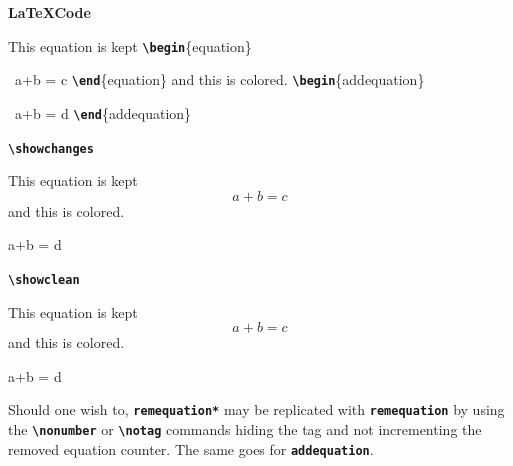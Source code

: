 \documentclass[a4paper]{ltxdoc}
\newcommand{\writecommand}[1]{\texttt{\textbf{{\textbackslash#1}}}}
\newcommand{\writeenv}[1]{\texttt{\textbf{{#1}}}}
\newcommand{\writearg}[1]{\{#1\}}
\begin{document}
\begin{center}
    \begin{minipage}[t]{0.3\linewidth}
    \textbf{\LaTeX Code}
    
    This equation is kept \newline
    \writecommand{begin}\writearg{equation}

    ~\quad a+b = c\newline
    \writecommand{end}\writearg{equation}\newline
    and this is colored.\newline
    \writecommand{begin}\writearg{addequation}

    ~\quad a+b = d\newline
    \writecommand{end}\writearg{addequation}\newline
    
    \end{minipage}
    \hfill
    \begin{minipage}[t]{0.3\linewidth}
    \writecommand{showchanges}
    \showchanges
    
    This equation is kept
    \begin{equation}
        a+b = c
    \end{equation}
    and this is colored.
    \begin{addequation}
        a+b = d
    \end{addequation}\addtocounter{equation}{-2}
    
    \end{minipage}
    \hfill
    \begin{minipage}[t]{0.3\linewidth}   
    \writecommand{showclean}
    \showclean
    
    This equation is kept
    \begin{equation}
        a+b = c
    \end{equation}
    and this is colored.
    \begin{addequation}
        a+b = d
    \end{addequation}\addtocounter{equation}{-2}

\end{minipage}
\end{center}
\showchanges

Should one wish to, \writeenv{remequation*} may be replicated with \writeenv{remequation} by using the \writecommand{nonumber} or \writecommand{notag} commands hiding the tag and not incrementing the removed equation counter.  The same goes for \writeenv{addequation}.
\end{document}
